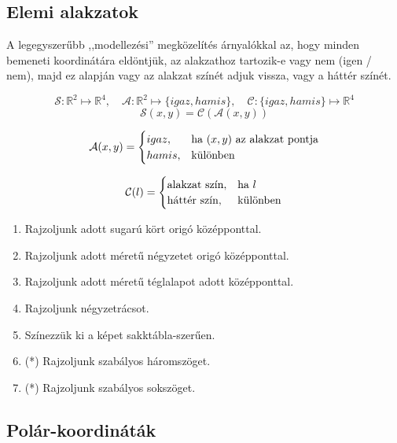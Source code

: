 \subsection{Elemi alakzatok}

A legegyszerűbb ,,modellezési'' megközelítés árnyalókkal az, hogy minden bemeneti koordinátára
eldöntjük, az alakzathoz tartozik-e vagy nem (igen / nem), majd ez alapján vagy az
alakzat színét adjuk vissza, vagy a háttér színét.

\begin{tcolorbox}
  
  $$
  \mathcal{S}: \mathbb{R}^2 \mapsto \mathbb{R}^4,\quad
  \mathcal{A}: \mathbb{R}^2 \mapsto \{igaz, hamis\},\quad
  \mathcal{C}: \{igaz, hamis\} \mapsto \mathbb{R}^4
  $$
  $$\mathcal{S}(x, y) = \mathcal{C}(\mathcal{A}(x,y))$$

  $$\mathcal{A}(x,y) = 
    \begin{cases}
      igaz,  &\text{ha~} (x, y) \text{~az alakzat pontja}\cr
      hamis, &\text{különben}
    \end{cases}
  $$

  $$\mathcal{C}(l) = 
    \begin{cases}
      \text{alakzat szín},  &\text{ha~} l\cr
      \text{háttér szín}, &\text{különben}
    \end{cases}
  $$

  \end{tcolorbox}

\progfeladatok

\begin{enumerate}[resume]
  \item Rajzoljunk adott sugarú kört origó középponttal.
  \item Rajzoljunk adott méretű négyzetet origó középponttal.
  \item Rajzoljunk adott méretű téglalapot adott középponttal.
  \item Rajzoljunk négyzetrácsot.
  \item Színezzük ki a képet sakktábla-szerűen.
  \item (*) Rajzoljunk szabályos háromszöget.
  \item (*) Rajzoljunk szabályos sokszöget.
\end{enumerate}

\subsection{Polár-koordináták}

